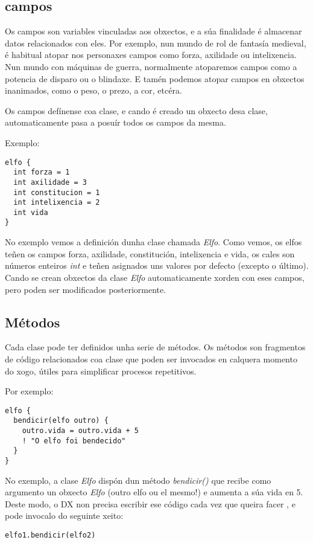 \subsection{campos}
Os campos son variables vinculadas aos obxectos, e a súa finalidade é
almacenar datos relacionados con eles. Por exemplo, nun mundo de rol de fantasía
medieval, é habitual atopar nos personaxes campos como forza, axilidade ou
intelixencia. Nun mundo con máquinas de guerra, normalmente atoparemos campos
como a potencia de disparo ou o blindaxe. E tamén podemos atopar campos en
obxectos inanimados, como o peso, o prezo, a cor, etcéra.
\par
Os campos defínense coa clase, e cando é creado un obxecto desa clase,
automaticamente pasa a posuír todos os campos da mesma.
\par
Exemplo:
\begin{lstlisting}
elfo {
  int forza = 1
  int axilidade = 3
  int constitucion = 1
  int intelixencia = 2
  int vida
}
\end{lstlisting}
\par No exemplo vemos a definición dunha clase chamada {\it Elfo}. Como vemos,
os elfos teñen os campos forza, axilidade, constitución, intelixencia e vida,
os cales son números enteiros {\it int} e teñen asignados uns valores por
defecto (excepto o último).
Cando se crean obxectos da clase {\it Elfo} automaticamente xorden con eses
campos, pero poden ser modificados posteriormente.

\subsection{Métodos}
\label{subsec:metodos}
Cada clase pode ter definidos unha serie de métodos. Os métodos son fragmentos
de código relacionados coa clase que poden ser invocados en calquera momento do
xogo, útiles para simplificar procesos repetitivos.
\par Por exemplo:
\begin{lstlisting}
elfo {
  bendicir(elfo outro) {
    outro.vida = outro.vida + 5
    ! "O elfo foi bendecido"
  }
}
\end{lstlisting}
\par No exemplo, a clase {\it Elfo} dispón dun método {\it bendicir()} que recibe
como argumento un obxecto {\it Elfo} (outro elfo ou el mesmo!) e aumenta a súa
vida en 5. Deste modo, o DX non precisa escribir ese código cada vez que queira
facer , e pode invocalo do seguinte xeito:
\begin{lstlisting}
elfo1.bendicir(elfo2)
\end{lstlisting}
